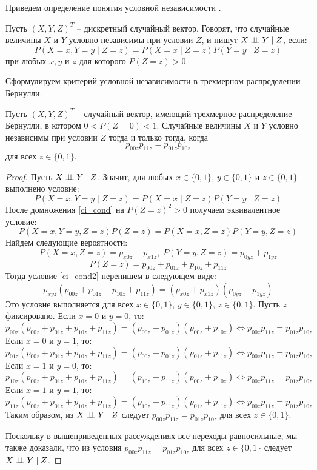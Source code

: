 Приведем определение понятия условной независимости \cite{Lauritzen1996}.
\begin{definition}\label{cond_ind_def}
    Пусть $(X,Y,Z)^T$ -- дискретный случайный вектор.
    Говорят, что случайные величины $X$ и $Y$ условно независимы при условии $Z$,
    и пишут $X \perp\!\!\!\perp Y \mid Z$, если:
    $$
    P(X=x, Y=y \mid Z = z) = P(X=x \mid Z = z) P(Y=y \mid Z = z)
    $$
    при любых $x,y$ и $z$ для которого $P(Z=z)>0$.
\end{definition}
Сформулируем критерий условной независимости в трехмерном
распределении Бернулли.
\begin{theorem}\label{thm1}
    Пусть $(X,Y,Z)^T$ -- случайный вектор, имеющий трехмерное распределение Бернулли, в котором $0<P(Z=0)<1$.
    Случайные величины $X$ и $Y$ условно независимы при условии $Z$ тогда и только тогда, когда
    $$p_{00z}p_{11z}=p_{01z}p_{10z}$$ для всех $z\in \{0,1\}$.
\end{theorem}
\begin{proof}
    Пусть $X \perp\!\!\!\perp Y \mid Z$. Значит, для любых $x\in \{0,1\}$, $y\in \{0,1\}$ и $z\in \{0,1\}$ выполнено условие:
    \begin{equation}\label{ci_cond}
        P(X=x, Y=y \mid Z = z) = P(X=x \mid Z = z) P(Y=y \mid Z = z)
    \end{equation}
    После домножения \eqref{ci_cond} на $P(Z=z)^2>0$ получаем эквивалентное условие:
    \begin{equation}\label{ci_cond2}
        P(X=x,Y=y,Z=z)P(Z=z)=P(X=x,Z=z)P(Y=y,Z=z)
    \end{equation}
    Найдем следующие вероятности:
    $$
        P(X=x, Z=z) = p_{x0z} + p_{x1z},\;  P(Y=y, Z=z) = p_{0yz} + p_{1yz}
    $$
    $$
        P(Z=z)= p_{00z} + p_{01z} + p_{10z} + p_{11z}
    $$
    Тогда условие \eqref{ci_cond2} перепишем в следующем виде:
    $$
        p_{xyz} (p_{00z} + p_{01z} + p_{10z} + p_{11z}) = (p_{x0z} + p_{x1z}) (p_{0yz} + p_{1yz})
    $$
    Это условие выполняется для всех $x \in \{0,1\}$, $y\in \{0,1\}$, $z\in \{0,1\}$.
    Пусть $z$ фиксировано.
    Если $x=0$ и $y=0$, то:
    $$
        p_{00z} (p_{00z} + p_{01z} + p_{10z} + p_{11z}) = (p_{00z} + p_{01z}) (p_{00z} + p_{10z})
    \Leftrightarrow
        p_{00z} p_{11z} = p_{01z} p_{10z}
    $$
    Если $x=0$ и $y=1$, то:
    $$
        p_{01z} (p_{00z} + p_{01z} + p_{10z} + p_{11z}) = (p_{00z} + p_{01z}) (p_{01z} + p_{11z})
    \Leftrightarrow
    p_{00z} p_{11z} = p_{01z} p_{10z}
    $$
    Если $x=1$ и $y=0$, то:
    $$
        p_{10z} (p_{00z} + p_{01z} + p_{10z} + p_{11z}) = (p_{10z} + p_{11z}) (p_{00z} + p_{10z})
    \Leftrightarrow
    p_{00z} p_{11z} = p_{01z} p_{10z}
    $$
    Если $x=1$ и $y=1$, то:
    $$
        p_{11z} (p_{00z} + p_{01z} + p_{10z} + p_{11z}) = (p_{10z} + p_{11z}) (p_{01z} + p_{11z})
    \Leftrightarrow
    p_{00z} p_{11z} = p_{01z} p_{10z}
    $$
    Таким образом, из $X \perp\!\!\!\perp Y \mid Z$ следует
    $p_{00z}p_{11z}=p_{01z}p_{10z}$ для всех $z \in \{0,1\}$.

    Поскольку в вышеприведенных рассуждениях все переходы равносильные,
    мы также доказали, что из условия $p_{00z}p_{11z}=p_{01z}p_{10z}$ для всех $z \in \{0,1\}$
    следует $X \perp\!\!\!\perp Y \mid Z$.
\end{proof}
